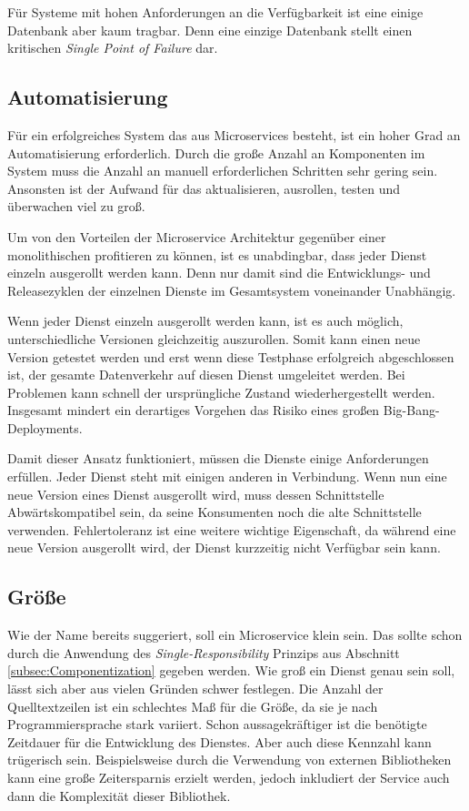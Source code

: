 Für Systeme mit hohen Anforderungen an die Verfügbarkeit ist eine einige Datenbank aber kaum tragbar. Denn eine einzige Datenbank stellt einen kritischen \textit{Single Point of Failure} dar.

\subsection{Automatisierung}

Für ein erfolgreiches System das aus Microservices besteht, ist ein hoher Grad an Automatisierung erforderlich. Durch die große Anzahl an Komponenten im System muss die Anzahl an manuell erforderlichen Schritten sehr gering sein. Ansonsten ist der Aufwand für das aktualisieren, ausrollen, testen und überwachen viel zu groß.

Um von den Vorteilen der Microservice Architektur gegenüber einer monolithischen profitieren zu können, ist es unabdingbar, dass jeder Dienst einzeln ausgerollt werden kann. Denn nur damit sind die Entwicklungs- und Releasezyklen der einzelnen Dienste im Gesamtsystem voneinander Unabhängig.

Wenn jeder Dienst einzeln ausgerollt werden kann, ist es auch möglich, unterschiedliche Versionen gleichzeitig auszurollen. Somit kann einen neue Version getestet werden und erst wenn diese Testphase erfolgreich abgeschlossen ist, der gesamte Datenverkehr auf diesen Dienst umgeleitet werden. Bei Problemen kann schnell der ursprüngliche Zustand wiederhergestellt werden. Insgesamt mindert ein derartiges Vorgehen das Risiko eines großen Big-Bang-Deployments.

Damit dieser Ansatz funktioniert, müssen die Dienste einige Anforderungen erfüllen. Jeder Dienst steht mit einigen anderen in Verbindung. Wenn nun eine neue Version eines Dienst ausgerollt wird, muss dessen Schnittstelle Abwärtskompatibel sein, da seine Konsumenten noch die alte Schnittstelle verwenden. Fehlertoleranz ist eine weitere wichtige Eigenschaft, da während eine neue Version ausgerollt wird, der Dienst kurzzeitig nicht Verfügbar sein kann.

\subsection{Größe}

Wie der Name bereits suggeriert, soll ein Microservice klein sein. Das sollte schon durch die Anwendung des \textit{Single-Responsibility} Prinzips aus Abschnitt \ref{subsec:Componentization} gegeben werden. Wie groß ein Dienst genau sein soll, lässt sich aber aus vielen Gründen schwer festlegen. Die Anzahl der Quelltextzeilen ist ein schlechtes Maß für die Größe, da sie je nach Programmiersprache stark variiert. Schon aussagekräftiger ist die benötigte Zeitdauer für die Entwicklung des Dienstes. Aber auch diese Kennzahl kann trügerisch sein. Beispielsweise durch die Verwendung von externen Bibliotheken kann eine große Zeitersparnis erzielt werden, jedoch inkludiert der Service auch dann die Komplexität dieser Bibliothek.

